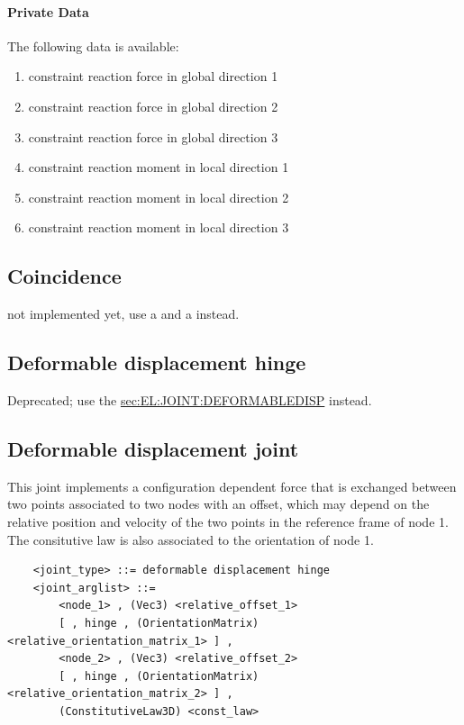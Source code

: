 \paragraph{Private Data}
The following data is available:
\begin{enumerate}
\item {} constraint reaction force in global direction 1
\item {} constraint reaction force in global direction 2
\item {} constraint reaction force in global direction 3
\item {} constraint reaction moment in local direction 1
\item {} constraint reaction moment in local direction 2
\item {} constraint reaction moment in local direction 3
\end{enumerate}




\subsection{Coincidence}
not implemented yet, use a  and a  
instead.

\subsection{Deformable displacement hinge}
Deprecated; use the 
\hyperref{\kw{deformable displacement joint}}{\kw{deformable displacement joint} (see Section~}{)}{sec:EL:JOINT:DEFORMABLEDISP}
instead.


\subsection{Deformable displacement joint}\label{sec:EL:JOINT:DEFORMABLEDISP}
This joint implements a configuration dependent force that is exchanged
between two points associated to two nodes with an offset, which may depend
on the relative position and velocity of the two points in the reference
frame of node 1.
The consitutive law is also associated to the orientation of node 1.
\begin{verbatim}
    <joint_type> ::= deformable displacement hinge
    <joint_arglist> ::= 
        <node_1> , (Vec3) <relative_offset_1>
        [ , hinge , (OrientationMatrix) <relative_orientation_matrix_1> ] ,
        <node_2> , (Vec3) <relative_offset_2>
        [ , hinge , (OrientationMatrix) <relative_orientation_matrix_2> ] ,
        (ConstitutiveLaw3D) <const_law>
\end{verbatim}

